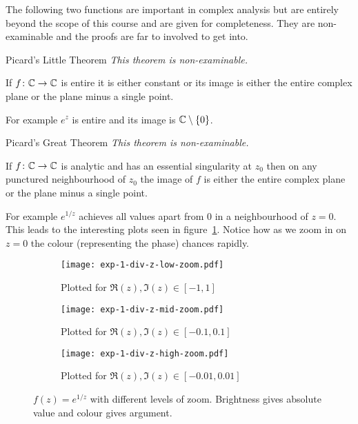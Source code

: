 \documentclass{article}
\begin{document}
    The following two functions are important in complex analysis but are entirely beyond the scope of this course and are given for completeness.
    They are non-examinable and the proofs are far to involved to get into.
    \begin{theorem*}{Picard's Little Theorem}
        \emph{This theorem is non-examinable.}
        
        If \(f\colon\mathbb{C}\to\mathbb{C}\) is entire it is either constant or its image is either the entire complex plane or the plane minus a single point.
    \end{theorem*}
    For example \(e^z\) is entire and its image is \(\mathbb{C}\setminus\{0\}\).
    \begin{theorem*}{Picard's Great Theorem}
        \emph{This theorem is non-examinable.}
        
        If \(f\colon\mathbb{C}\to\mathbb{C}\) is analytic and has an essential singularity at \(z_0\) then on any punctured neighbourhood of \(z_0\) the image of \(f\) is either the entire complex plane or the plane minus a single point.
    \end{theorem*}
    For example \(e^{1/z}\) achieves all values apart from 0 in a neighbourhood of \(z = 0\).
    This leads to the interesting plots seen in figure~\ref{fig:exp(1/z)}.
    Notice how as we zoom in on \(z = 0\) the colour (representing the phase) chances rapidly.
    \begin{figure}
        \centering
        \begin{subfigure}{0.48\textwidth}
            \centering
            \texttt{[image: exp-1-div-z-low-zoom.pdf]}
            \caption{Plotted for \(\Re(z), \Im(z)\in[-1, 1]\)}
        \end{subfigure}
        \begin{subfigure}{0.48\textwidth}
            \centering
            \texttt{[image: exp-1-div-z-mid-zoom.pdf]}
            \caption{Plotted for \(\Re(z), \Im(z)\in[-0.1, 0.1]\)}
        \end{subfigure}
        \begin{subfigure}{\textwidth}
            \centering
            \texttt{[image: exp-1-div-z-high-zoom.pdf]}
            \caption{Plotted for \(\Re(z), \Im(z)\in[-0.01, 0.01]\)}
        \end{subfigure}
        \caption{\(f(z) = e^{1/z}\) with different levels of zoom. Brightness gives absolute value and colour gives argument.}
        \label{fig:exp(1/z)}
    \end{figure}
\end{document}
